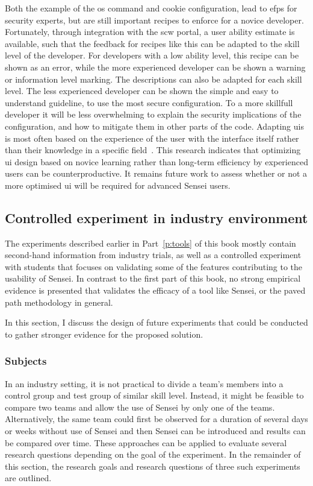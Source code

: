 Both the example of the \gls{os} command and cookie configuration, lead to \glspl{efp} for security experts, but are still important recipes to enforce for a novice developer.
Fortunately, through integration with the \gls{scw} portal, a user ability estimate is available, such that the feedback for recipes like this can be adapted to the skill level of the developer.
For developers with a low ability level, this recipe can be shown as an error, while the more experienced developer can be shown a warning or information level marking.
The descriptions can also be adapted for each skill level.
The less experienced developer can be shown the simple and easy to understand guideline, to use the most secure configuration.
To a more skillfull developer it will be less overwhelming to explain the security implications of the configuration, and how to mitigate them in other parts of the code.
Adapting \glspl{ui} is most often based on the experience of the user with the interface itself rather than their knowledge in a specific field~\cite{johnson2015bespoke, cockburn2014supporting}.
This research indicates that optimizing \gls{ui} design based on novice learning rather than long-term efficiency by experienced users can be counterproductive.
It remains future work to assess whether or not a more optimised \gls{ui} will be required for advanced Sensei users.


\subsection{Controlled experiment in industry environment}
\label{sec:design-future-experiments}

The experiments described earlier in Part~\ref{p:tools} of this book mostly contain second-hand information from industry trials, as well as a controlled experiment with students that focuses on validating some of the features contributing to the usability of Sensei.
In contrast to the first part of this book, no strong empirical evidence is presented that validates the efficacy of a tool like Sensei, or the paved path methodology in general.

In this section, I discuss the design of future experiments that could be conducted to gather stronger evidence for the proposed solution.

\subsubsection{Subjects}
In an industry setting, it is not practical to divide a team's members into a control group and test group of similar skill level.
Instead, it might be feasible to compare two teams and allow the use of Sensei by only one of the teams.
Alternatively, the same team could first be observed for a duration of several days or weeks without use of Sensei and then Sensei can be introduced and results can be compared over time.
These approaches can be applied to evaluate several research questions depending on the goal of the experiment.
In the remainder of this section, the research goals and research questions of three such experiments are outlined.


